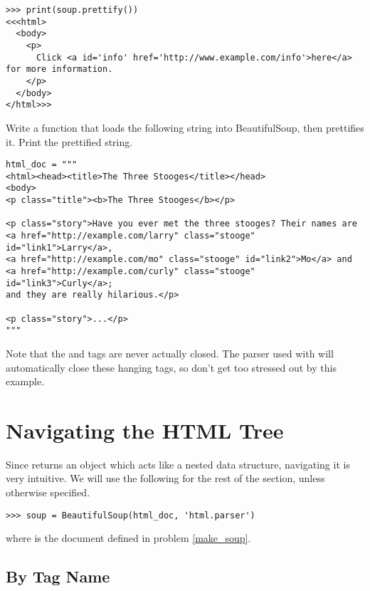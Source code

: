 \begin{lstlisting}
>>> print(soup.prettify())
<<<html>
  <body>
    <p>
      Click <a id='info' href='http://www.example.com/info'>here</a> for more information.
    </p>
  </body>
</html>>>
\end{lstlisting}

\begin{problem}\label{make_soup}
Write a function that loads the following string into BeautifulSoup, then prettifies it. Print the prettified string.
\begin{lstlisting}
html_doc = """
<html><head><title>The Three Stooges</title></head>
<body>
<p class="title"><b>The Three Stooges</b></p>

<p class="story">Have you ever met the three stooges? Their names are
<a href="http://example.com/larry" class="stooge" id="link1">Larry</a>,
<a href="http://example.com/mo" class="stooge" id="link2">Mo</a> and
<a href="http://example.com/curly" class="stooge" id="link3">Curly</a>;
and they are really hilarious.</p>

<p class="story">...</p>
"""
\end{lstlisting}

\begin{info}
Note that the  and  tags are never actually closed.
The parser used with  will automatically close these hanging tags, so don't get too stressed out by this example.
\end{info}

\end{problem}

\section*{Navigating the HTML Tree}

Since  returns an object which acts like a nested data structure, navigating it is very intuitive.
We will use the following for the rest of the section, unless otherwise specified.
\begin{lstlisting}
>>> soup = BeautifulSoup(html_doc, 'html.parser')
\end{lstlisting}
where  is the document defined in problem \ref{make_soup}.

\subsection*{By Tag Name}

